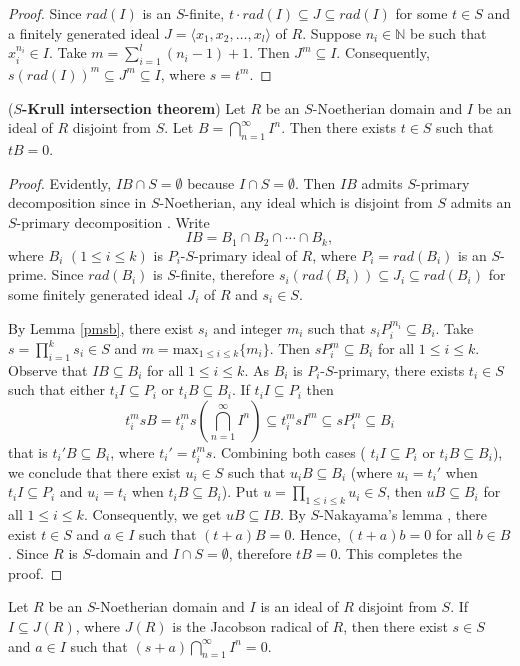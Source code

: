 \documentclass[11pt]{article}
\begin{document}
	\begin{proof}
		Since $rad(I)$ is an $S$-finite, $t\cdot rad(I)\subseteq J\subseteq rad(I)$ for some $t\in S$ and a finitely generated ideal $J=\langle x_1,x_2,\dots,x_l\rangle$ of $R$. Suppose $n_i\in \mathbb{N}$ be such that $x_i^{n_i}\in I$. Take $m=\sum_{i=1}^l (n_i-1)+1$. Then $J^m\subseteq I$. Consequently, $s(rad(I))^m\subseteq J^m\subseteq I$, where $s=t^m$. 
	\end{proof}
	\begin{theorem}(\textbf{$S$-Krull intersection theorem})\label{krull}
		Let $R$ be an $S$-Noetherian domain and $I$ be an ideal of $R$ disjoint from $S$. Let $B=\bigcap\limits_{n=1}^{\infty}I^{n}$. Then there exists $t\in S$ such that $tB=0$.
	\end{theorem}
	\begin{proof}
		
		Evidently, $IB\cap S=\emptyset$ because $I\cap S=\emptyset$. Then $IB$ admits $S$-primary decomposition since in $S$-Noetherian, any ideal which is disjoint from $S$ admits an $S$-primary decomposition \cite{st23}. Write $$IB=B_{1}\cap B_{2}\cap\cdots \cap B_{k},$$ where $B_{i}$ $(1\leq i\leq k)$ is $P_{i}$-$S$-primary ideal of $R$, where $P_i=rad(B_i)$ is an $S$-prime. Since $rad(B_{i})$ is $S$-finite, therefore $s_i(rad(B_{i}))\subseteq J_i\subseteq rad(B_{i})$ for some finitely generated ideal $J_i$ of $R$ and $s_i\in S$. 
		
		By Lemma \ref{pmsb}, there exist $s_i$ and integer $m_i$ such that $s_iP_i^{m_i}\subseteq B_i.$ Take $s=\prod_{i=1}^ks_i\in S$ and $m=\text{max}_{1\leq i\leq k}\{m_i\}$. Then $sP_i^m\subseteq B_i$ for all $1\leq i\leq k$.
		Observe that $IB\subseteq B_i$ for all $1\leq i\leq k$. As $B_i$ is $P_i$-$S$-primary, there exists $t_i\in S$ such that either $t_iI\subseteq  P_i$ or $t_iB\subseteq B_i$. If $t_iI\subseteq  P_i$ then $$t_i^msB=t_i^ms\left ( \bigcap_{n=1}^{\infty} I^n\right )\subseteq t_i^msI^m\subseteq sP_i^m\subseteq B_i$$
		that is $t_i'B\subseteq B_i$, where $t_i'=t_i^ms$. Combining both cases ( $t_iI\subseteq  P_i$ or $t_iB\subseteq B_i$), we conclude that there exist $u_i\in S$ such that $u_iB\subseteq B_i$ (where $u_i=t_i'$ when $t_iI\subseteq P_i$ and $u_i=t_i$ when $t_iB\subseteq B_i$). Put $u=\prod_{1\leq i\leq k} u_i\in S$, then $uB\subseteq B_i$ for all $1\leq i\leq k$. Consequently, we get $uB\subseteq IB$. By $S$-Nakayama's lemma \cite[Lemma 2.1]{ah2020}, there exist $t\in S$ and $a\in I$ such that $(t+a)B=0$. Hence, $(t+a)b=0$ for all $b\in B$. Since $R$ is $S$-domain and $I\cap S=\emptyset$, therefore $tB=0$. This completes the proof.
\end{proof} 
\begin{cor}
	Let $R$ be an $S$-Noetherian domain and $I$ is an ideal of $R$ disjoint from $S$. If $I\subseteq J(R)$, where $J(R)$ is the Jacobson radical of $R$, then there exist $s\in S$ and $a\in I$ such that $(s+a)\bigcap\limits_{n=1}^{\infty}I^{n}=0$.
\end{cor}  
\end{document}
